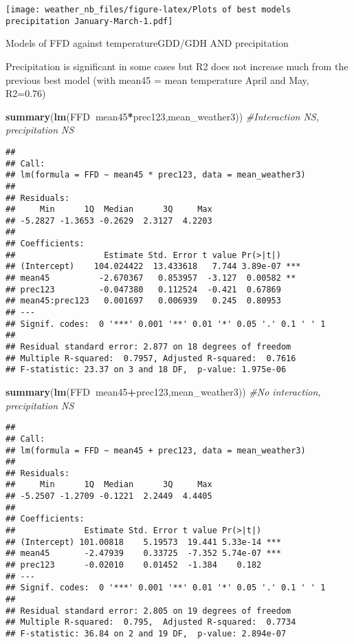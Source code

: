 \documentclass[10pt,]{article}
\newenvironment{Shaded}{\begin{snugshade}}{\end{snugshade}}
\newcommand{\KeywordTok}[1]{\textcolor[rgb]{0.13,0.29,0.53}{\textbf{#1}}}
\newcommand{\CommentTok}[1]{\textcolor[rgb]{0.56,0.35,0.01}{\textit{#1}}}
\newcommand{\OperatorTok}[1]{\textcolor[rgb]{0.81,0.36,0.00}{\textbf{#1}}}
\newcommand{\NormalTok}[1]{#1}
\begin{document}
\texttt{[image: weather\_nb\_files/figure-latex/Plots of best models precipitation January-March-1.pdf]}

Models of FFD against temperatureGDD/GDH AND precipitation

Precipitation is significant in some cases but R2 does not increase much
from the previous best model (with mean45 = mean temperature April and
May, R2=0.76)

\begin{Shaded}
\begin{Highlighting}[]
\KeywordTok{summary}\NormalTok{(}\KeywordTok{lm}\NormalTok{(FFD}\OperatorTok{~}\NormalTok{mean45}\OperatorTok{*}\NormalTok{prec123,mean_weather3))  }\CommentTok{#Interaction NS, precipitation NS}
\end{Highlighting}
\end{Shaded}

\begin{verbatim}
## 
## Call:
## lm(formula = FFD ~ mean45 * prec123, data = mean_weather3)
## 
## Residuals:
##     Min      1Q  Median      3Q     Max 
## -5.2827 -1.3653 -0.2629  2.3127  4.2203 
## 
## Coefficients:
##                  Estimate Std. Error t value Pr(>|t|)    
## (Intercept)    104.024422  13.433618   7.744 3.89e-07 ***
## mean45          -2.670367   0.853957  -3.127  0.00582 ** 
## prec123         -0.047380   0.112524  -0.421  0.67869    
## mean45:prec123   0.001697   0.006939   0.245  0.80953    
## ---
## Signif. codes:  0 '***' 0.001 '**' 0.01 '*' 0.05 '.' 0.1 ' ' 1
## 
## Residual standard error: 2.877 on 18 degrees of freedom
## Multiple R-squared:  0.7957, Adjusted R-squared:  0.7616 
## F-statistic: 23.37 on 3 and 18 DF,  p-value: 1.975e-06
\end{verbatim}

\begin{Shaded}
\begin{Highlighting}[]
\KeywordTok{summary}\NormalTok{(}\KeywordTok{lm}\NormalTok{(FFD}\OperatorTok{~}\NormalTok{mean45}\OperatorTok{+}\NormalTok{prec123,mean_weather3))  }\CommentTok{#No interaction, precipitation NS}
\end{Highlighting}
\end{Shaded}

\begin{verbatim}
## 
## Call:
## lm(formula = FFD ~ mean45 + prec123, data = mean_weather3)
## 
## Residuals:
##     Min      1Q  Median      3Q     Max 
## -5.2507 -1.2709 -0.1221  2.2449  4.4405 
## 
## Coefficients:
##              Estimate Std. Error t value Pr(>|t|)    
## (Intercept) 101.00818    5.19573  19.441 5.33e-14 ***
## mean45       -2.47939    0.33725  -7.352 5.74e-07 ***
## prec123      -0.02010    0.01452  -1.384    0.182    
## ---
## Signif. codes:  0 '***' 0.001 '**' 0.01 '*' 0.05 '.' 0.1 ' ' 1
## 
## Residual standard error: 2.805 on 19 degrees of freedom
## Multiple R-squared:  0.795,  Adjusted R-squared:  0.7734 
## F-statistic: 36.84 on 2 and 19 DF,  p-value: 2.894e-07
\end{verbatim}
\end{document}
